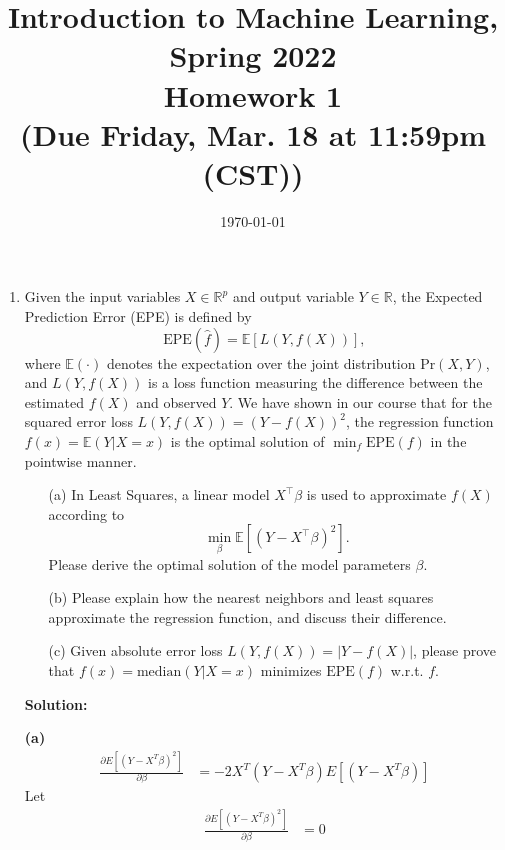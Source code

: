 \documentclass[10pt]{article}
\begin{document}
\date{\today}
\title{Introduction to Machine Learning, Spring 2022 \\
	Homework 1\\
	\small (Due Friday, Mar. 18 at 11:59pm (CST))}
\maketitle
\begin{enumerate}[1.]


	\item {} Given the input variables $X \in \mathbb{R}^p$ and output variable $Y \in \mathbb{R}$, the Expected Prediction Error (EPE) is defined by
	      \begin{equation}
		      \text{EPE}(\hat{f}) = \mathbb{E}[L(Y,f(X))],
	      \end{equation}
	      where $\mathbb{E}(\cdot)$ denotes the expectation over the joint distribution $\text{Pr}(X,Y)$, and $L(Y,f(X))$ is a loss function measuring the difference between the estimated $f(X)$ and observed $Y$.
	      We have shown in our course that for the squared error loss $L(Y,f(X))=(Y-f(X))^2$, the regression function $f(x) = \mathbb{E}(Y|X=x)$
	      is the optimal solution of $\min_f \text{EPE}(f)$ in the pointwise manner.
	      \begin{itemize}
		      \item[(a)] In Least Squares, a linear model $X^\top \beta$ is used to approximate $f(X)$ according to
		            \begin{equation}
			            \min_\beta  \mathbb{E}[(Y-X^\top \beta)^2].
		            \end{equation}
		            Please derive the optimal solution of the model parameters $\beta$.~
		      \item[(b)] Please explain how the nearest neighbors and least squares approximate the regression function, and discuss their difference.~
		      \item[(c)] Given absolute error loss $L(Y,f(X))=|Y-f(X)|$, please prove that $f(x) = \text{median}(Y|X=x)$ minimizes $\text{EPE}(f)$ w.r.t. $f$.~
	      \end{itemize}


\textbf{Solution:}
	\item[\textbf{(a)}] 
	$$
	\begin{aligned}
	\frac{\partial E[(Y-X^T\beta)^2]}{\partial \beta} &= -2X^T(Y-X^T\beta)E[(Y-X^T\beta)] 
	\end{aligned} 
	$$
	Let $$
	\begin{aligned}
	\frac{\partial E[(Y-X^T\beta)^2]}{\partial \beta} &= 0
	\end{aligned} 
	$$
	

\end{enumerate}
\end{document}

